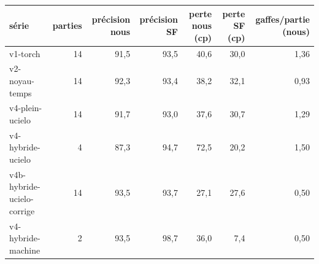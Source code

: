 \begin{tabular}{lrrrrrr}
\toprule
série & parties & précision nous & précision SF & perte nous (cp) & perte SF (cp) & gaffes/partie (nous)\\
\midrule
v1-torch & 14 & 91{,}5 & 93{,}5 & 40{,}6 & 30{,}0 & 1{,}36\\
v2-noyau-temps & 14 & 92{,}3 & 93{,}4 & 38{,}2 & 32{,}1 & 0{,}93\\
v4-plein-ucielo & 14 & 91{,}7 & 93{,}0 & 37{,}6 & 30{,}7 & 1{,}29\\
v4-hybride-ucielo & 4 & 87{,}3 & 94{,}7 & 72{,}5 & 20{,}2 & 1{,}50\\
v4b-hybride-ucielo-corrige & 14 & 93{,}5 & 93{,}7 & 27{,}1 & 27{,}6 & 0{,}50\\
v4-hybride-machine & 2 & 93{,}5 & 98{,}7 & 36{,}0 & 7{,}4 & 0{,}50\\
\bottomrule
\end{tabular}
